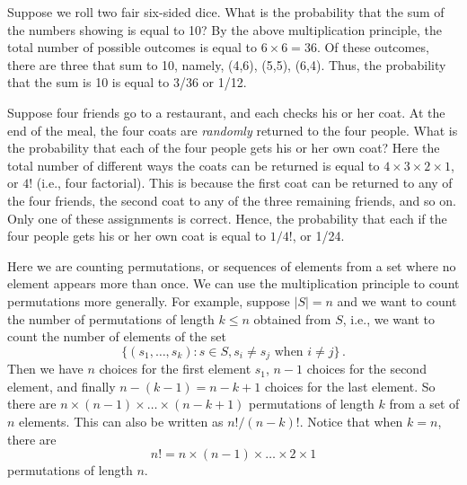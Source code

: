 \begin{example}
    Suppose we roll two fair six-sided dice. What is the probability that the sum of the numbers showing is equal to 10? By the above multiplication principle, the total number of possible outcomes is equal to $6\times6=36$. Of these outcomes, there are three that sum to 10, namely, (4,6), (5,5), (6,4). Thus, the probability that the sum is 10 is equal to 3/36 or 1/12.
\end{example}

\begin{example}
    Suppose four friends go to a restaurant, and each checks his or her coat. At the end of the meal, the four coats are \emph{randomly} returned to the four people. What is the probability that each of the four people gets his or her own coat? Here the total number of different ways the coats can be returned  is equal to $4\times3\times2\times1$, or $4!$ (i.e., four factorial). This is because the first coat can be returned to any of the four friends, the second coat to any of the three remaining friends, and so on. Only one of these assignments is correct. Hence, the probability that each if the four people gets his or her own coat is equal to $1/4!$, or 1/24.

    Here we are counting permutations, or sequences of elements from a set where no element appears more than once. We can use the multiplication principle to count permutations more generally. For example, suppose $|S|=n$ and we want to count the number of permutations of length $k \leqslant n$ obtained from $S$, i.e., we want to count the number of elements of the set
   $$
   \{(s_1,\dots,s_k):s\in S, s_i \neq s_j \text{ when } i \neq j\}\,.
   $$
   Then we have $n$ choices for the first element $s_1$, $n-1$ choices for the second element, and finally $n-(k-1)=n-k+1$ choices for the last element. So there are $n\times(n-1)\times\dots\times(n-k+1)$ permutations of length $k$ from a set of $n$ elements. This can also be written as $n! / (n-k)!$. Notice that when $k=n$, there are
   $$
   n!=n\times(n-1)\times\dots\times2\times1
   $$
   permutations of length $n$.
\end{example}

